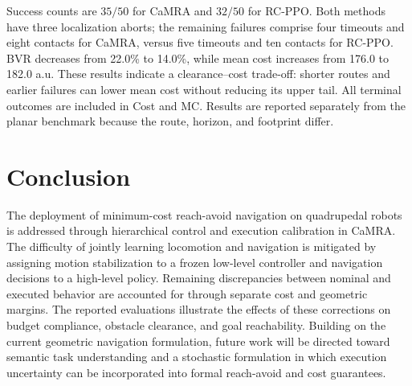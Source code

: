 \documentclass[conference]{IEEEtran}
\begin{document}
Success counts are $35/50$ for CaMRA and $32/50$ for RC-PPO. Both methods
have three localization aborts; the remaining failures comprise four timeouts and eight contacts
for CaMRA, versus five timeouts and ten contacts for RC-PPO. BVR decreases
from 22.0\% to 14.0\%, while mean cost increases from 176.0 to 182.0 a.u.
These results indicate a clearance--cost trade-off: shorter routes and
earlier failures can lower mean cost without reducing its upper tail.
All terminal outcomes are included in Cost and MC. Results are reported separately
from the planar benchmark because the route, horizon, and footprint differ.

\section{Conclusion}
The deployment of minimum-cost reach-avoid navigation on quadrupedal robots is
addressed through hierarchical control and execution calibration in CaMRA. The
difficulty of jointly learning locomotion and navigation is mitigated by assigning
motion stabilization to a frozen low-level controller and navigation decisions to
a high-level policy. Remaining discrepancies between nominal and executed behavior
are accounted for through separate cost and geometric margins. The reported
evaluations illustrate the effects of these corrections on budget compliance,
obstacle clearance, and goal reachability.
Building on the current geometric navigation formulation, future work will be
directed toward semantic task understanding and a stochastic formulation in which
execution uncertainty can be incorporated into formal reach-avoid and cost
guarantees.

\IEEEtriggercmd{\balance}


\end{document}
